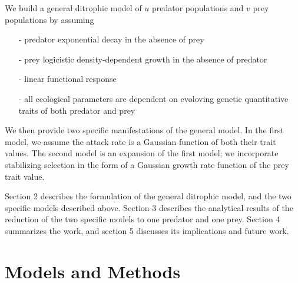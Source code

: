 \documentclass{amsart}
\theoremstyle{definition}
\theoremstyle{remark}
\numberwithin{equation}{section}
\begin{document}
We build a general ditrophic model of $u$ predator populations and $v$ prey populations by assuming
\begin{itemize}
	\item[-] predator exponential decay in the absence of prey
	\item[-] prey logicistic density-dependent growth in the absence of predator
	\item[-] linear functional response
	\item[-] all ecological parameters are dependent on evoloving genetic quantitative traits of both predator and prey
\end{itemize}

We then provide two specific manifestations of the general model.  In the first model, we assume the attack rate is a Gaussian function of both their trait values.  The second model is an expansion of the first model; we incorporate stabilizing selection in the form of a Gaussian growth rate function of the prey trait value.

Section 2 describes the formulation of the general ditrophic model, and the two specific models described above.  Section 3 describes the analytical results of the reduction of the two specific models to one predator and one prey.  Section 4 summarizes the work, and section 5 discusses its implications and future work.



































\section{Models and Methods}
\end{document}
